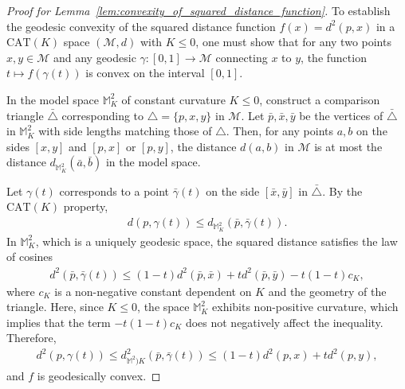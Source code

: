 \begin{proof}[Proof for Lemma~\ref{lem:convexity_of_squared_distance_function}]
    To establish the geodesic convexity of the squared distance function $f(x) = d^2(p, x)$ in a $\mathrm{CAT}(K)$ space $(\mathcal{M}, d)$ with $K \leq 0$, one must show that for any two points $x, y \in \mathcal{M}$ and any geodesic $\gamma\colon [0, 1] \to \mathcal{M}$ connecting $x$ to $y$, the function $t \mapsto f(\gamma(t))$ is convex on the interval $[0, 1]$.

    In the model space $\mathbb{M}^2_K$ of constant curvature $K \leq 0$, construct a comparison triangle $\bar{\triangle}$ corresponding to $\triangle = \{p, x, y\}$ in $\mathcal{M}$.
    Let $\bar{p}, \bar{x}, \bar{y}$ be the vertices of $\bar{\triangle}$ in $\mathbb{M}^2_K$ with side lengths matching those of $\triangle$.
    Then, for any points $a, b$ on the sides $[x, y]$ and $[p, x]$ or $[p, y]$, the distance $d(a, b)$ in $\mathcal{M}$ is at most the distance $d_{\mathbb{M}^2_K}(\bar{a}, \bar{b})$ in the model space.

    Let $\gamma(t)$ corresponds to a point $\bar{\gamma}(t)$ on the side $[\bar{x}, \bar{y}]$ in $\bar{\triangle}$.
    By the $\mathrm{CAT}(K)$ property,
    \begin{align*}
        d(p, \gamma(t)) \leq d_{\mathbb{M}^2_K}(\bar{p}, \bar{\gamma}(t)).
    \end{align*}
    In $\mathbb{M}^2_K$, which is a uniquely geodesic space, the squared distance satisfies the law of cosines
    \begin{align*}
        d^2(\bar{p}, \bar{\gamma}(t)) \leq (1 - t) d^2(\bar{p}, \bar{x}) + t d^2(\bar{p}, \bar{y}) - t(1 - t)c_K,
    \end{align*}
    where $c_K$ is a non-negative constant dependent on $K$ and the geometry of the triangle.
    Here, since $K \leq 0$, the space $\mathbb{M}^2_K$ exhibits non-positive curvature, which implies that the term $-t(1 - t)c_K$ does not negatively affect the inequality.
    Therefore,
    \begin{align*}
        d^2(p, \gamma(t)) \leq d^2_{\mathbb{M}^2)K}(\bar{p}, \bar{\gamma}(t)) \leq (1 - t)d^2(p, x) + t d^2(p, y),
    \end{align*}
    and $f$ is geodesically convex.
\end{proof}

